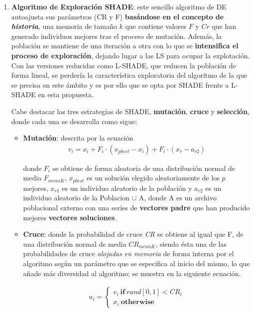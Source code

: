 \begin{enumerate}
	\item  \label{algSHADEILS:1} \textbf{Algoritmo de Exploración SHADE}: este sencillo algoritmo de DE autoajusta sus parámetros (CR y F) \textbf{basándose en el concepto de \textit{historia}}\cite{SHADE}, una memoria de tamaño $k$ que contiene valores $F$ y $Cr$ que han generado individuos mejores tras el proceso de mutación.  Además, la población se mantiene de una iteración a otra con lo que se \textbf{intensifica el proceso de exploración}, dejando lugar a las LS para ocupar la explotación. Con las versiones reducidas como L-SHADE\cite{LSHADE}, que reducen la población de forma lineal, se perdería la característica exploratoria del algoritmo de la que se precisa en este ámbito y es por ello que se opta por SHADE frente a L-SHADE en esta propuesta.
	
	Cabe destacar las tres estrategias de SHADE, \textbf{mutación}, \textbf{cruce} y \textbf{selección}, donde cada una se desarrolla como sigue:
	\begin{itemize}
		\item \textbf{Mutación}: descrita por la ecuación
		\begin{equation}\label{eq:MutationSH}
			\begin{gathered}
				v_i = x_i + F_i \cdot (x_{pbest} - x_i) + F_i \cdot (x_r - a_{r2})
			\end{gathered}
		\end{equation}
		 
		 donde $F_i$ se obtiene de forma aleatoria de una distribución normal de media $F_{meanK}$, $x_{pbest}$ es un solución elegido aleatoriamente de los $p$ mejores, $x_{r1}$ es un individuo aleatorio de la población y $a_{r2}$ es un individuo aleatorio de la Poblacion $\cup$ A, donde A es un archivo poblacional externo con una series de \textbf{vectores padre} que han producido mejores \textbf{vectores soluciones}\cite{SHADE}. 
			
		\item \textbf{Cruce}: donde la probabilidad de cruce \textit{CR} se obtiene al igual que F, de una distribución normal de media $CR_{meanK}$, siendo ésta una de las probabilidades de cruce \textit{alojadas en memoria} de forma interna por el algoritmo según un parámetro que se especifica al inicio del mismo, lo que añade más diversidad al algoritmo; se muestra en la siguiente ecuación.
		
		\begin{equation}\label{eq:CrossoverSH}
			\begin{gathered}
				u_i= \begin{cases}
					v_i \ \textbf{if} \ rand[0,1] < CR_i \\
					x_i \ \textbf{otherwise}
				\end{cases}
			\end{gathered}
		\end{equation}
		

\end{itemize}
\end{enumerate}
